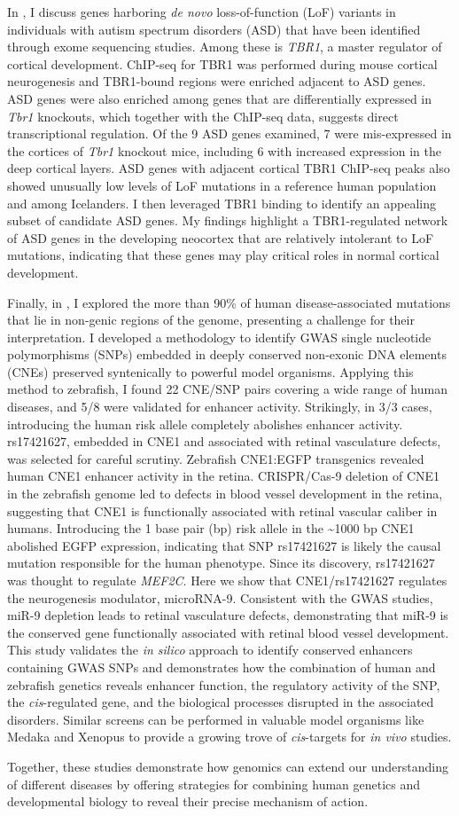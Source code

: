 In , I discuss genes harboring \emph{de novo} loss-of-function (LoF) variants in individuals with autism spectrum disorders (ASD) that have been identified through exome sequencing studies. Among these is \emph{TBR1}, a master regulator of cortical development. ChIP-seq for TBR1 was performed during mouse cortical neurogenesis and TBR1-bound regions were enriched adjacent to ASD genes. ASD genes were also enriched among genes that are differentially expressed in \emph{Tbr1} knockouts, which together with the ChIP-seq data, suggests direct transcriptional regulation. Of the 9 ASD genes examined, 7 were mis-expressed in the cortices of \emph{Tbr1} knockout mice, including 6 with increased expression in the deep cortical layers. ASD genes with adjacent cortical TBR1 ChIP-seq peaks also showed unusually low levels of LoF mutations in a reference human population and among Icelanders. I then leveraged TBR1 binding to identify an appealing subset of candidate ASD genes. My findings highlight a TBR1-regulated network of ASD genes in the developing neocortex that are relatively intolerant to LoF mutations, indicating that these genes may play critical roles in normal cortical development.

Finally, in , I explored the more than 90\% of human disease-associated mutations that lie in non-genic regions of the genome, presenting a challenge for their interpretation. I developed a methodology to identify GWAS single nucleotide polymorphisms (SNPs) embedded in deeply conserved non-exonic DNA elements (CNEs) preserved syntenically to powerful model organisms. Applying this method to zebrafish, I found 22 CNE/SNP pairs covering a wide range of human diseases, and  5/8 were validated for enhancer activity. Strikingly, in 3/3 cases, introducing the human risk allele completely abolishes enhancer activity. rs17421627, embedded in CNE1 and associated with retinal vasculature defects, was selected for careful scrutiny. Zebrafish CNE1:EGFP transgenics revealed human CNE1 enhancer activity in the retina. CRISPR/Cas-9 deletion of CNE1 in the zebrafish genome led to defects in blood vessel development in the retina, suggesting that CNE1 is functionally associated with retinal vascular caliber in humans. Introducing the 1 base pair (bp) risk allele in the \textasciitilde1000 bp CNE1 abolished EGFP expression, indicating that SNP rs17421627 is likely the causal mutation responsible for the human phenotype. Since its discovery,  rs17421627 was thought to regulate \emph{MEF2C}. Here we show that CNE1/rs17421627 regulates the neurogenesis modulator, microRNA-9. Consistent with the GWAS studies, miR-9 depletion leads to retinal vasculature defects, demonstrating that miR-9 is the conserved gene functionally associated with retinal blood vessel development. This study validates the \emph{in silico} approach to identify conserved enhancers containing GWAS SNPs and demonstrates how the combination of human and zebrafish genetics reveals enhancer function, the regulatory activity of the SNP, the \emph{cis}-regulated gene, and the biological processes disrupted in the associated disorders. Similar screens can be performed in valuable model organisms like Medaka and Xenopus to provide a growing trove of \emph{cis}-targets for \emph{in vivo} studies.

Together, these studies demonstrate how genomics can extend our understanding of different diseases by offering strategies for combining human genetics and developmental biology to reveal their precise mechanism of action.
